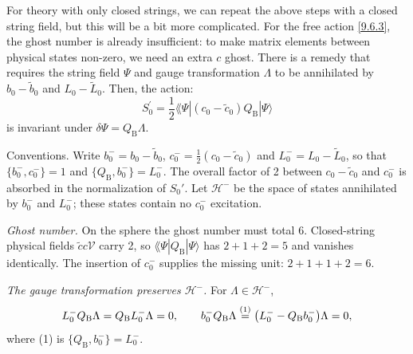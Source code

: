 For theory with only closed strings, we can repeat the above steps with a closed string field, but this will be a bit more complicated. For the free action \eqref{9.6.3}, the ghost number is already insufficient: 
to make matrix elements between physical states non-zero, we need an extra $c$ ghost.
There is a remedy that requires the string field $\Psi$ and gauge transformation $\Lambda$ to be annihilated by $b_{0}-\tilde{b}_{0}$ and $L_{0}-\tilde{L}_{0}$. Then, the action:
\begin{equation}
	S_{0}^{\prime}=\frac{1}{2}\lAngle\Psi |(c_{0}-\tilde{c}_{0}) Q_{\mathrm{B}}| \Psi\rangle \label{9.6.14}
\end{equation}
is invariant under $\delta \Psi=Q_{\mathrm{B}} \Lambda$.
\begin{tcolorbox}[breakable]
	\begin{remark}
		Conventions. Write $b_0^-=b_0-\tilde b_0$, $c_0^-=\frac12(c_0-\tilde c_0)$ and $L_0^-=L_0-\tilde L_0$, so that $\{b_0^-,c_0^-\}=1$ and $\{Q_{\mathrm B},b_0^-\}=L_0^-$. The overall factor of 2 between $c_0-\tilde c_0$ and $c_0^-$ is absorbed in the normalization of $S_0'$. Let $\mathscr H^-$ be the space of states annihilated by $b_0^-$ and $L_0^-$; these states contain no $c_0^-$ excitation.

		\emph{Ghost number.} On the sphere the ghost number must total 6. Closed-string physical fields $\tilde cc\mathscr V$ carry 2, so $\lAngle\Psi|Q_{\mathrm B}|\Psi\rangle$ has $2+1+2=5$ and vanishes identically. The insertion of $c_0^-$ supplies the missing unit: $2+1+1+2=6$.

		\emph{The gauge transformation preserves $\mathscr H^-$.} For $\Lambda\in\mathscr H^-$,
		\begin{equation*}
			L_0^-Q_{\mathrm B}\Lambda=Q_{\mathrm B}L_0^-\Lambda=0,\qquad b_0^-Q_{\mathrm B}\Lambda\overset{(1)}{=}\bigl(L_0^--Q_{\mathrm B}b_0^-\bigr)\Lambda=0 ,
		\end{equation*}
		where (1) is $\{Q_{\mathrm B},b_0^-\}=L_0^-$.


\end{remark}
\end{tcolorbox}
